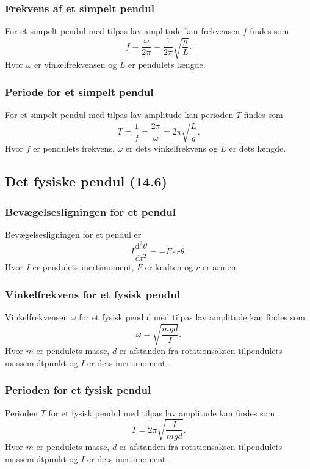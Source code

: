 \subsubsection{Frekvens af et simpelt pendul} \label{afs:frekspen}
For et simpelt pendul med tilpas lav amplitude kan frekvensen $f$ findes som
\[ 
f = \frac{\omega}{2\pi} = \frac{1}{2\pi} \sqrt{\frac{g}{L}}
.\]
Hvor $\omega$ er vinkelfrekvensen og $L$ er pendulets længde.


\subsubsection{Periode for et simpelt pendul} \label{afs:perspen}
For et simpelt pendul med tilpas lav amplitude kan perioden $T$ findes som
\[ 
T = \frac{1}{f} = \frac{2\pi}{\omega} = 2\pi \sqrt{\frac{L}{g}}
.\]
Hvor $f$ er pendulets frekvens, $\omega$ er dets vinkelfrekvens og $L$ er dets længde.



\subsection{Det fysiske pendul (14.6)}

\subsubsection{Bevægelsesligningen for et pendul} \label{afs:bevpen}
Bevægelsesligningen for et pendul er
\[ 
I \frac{\mathrm{d}^2 \theta}{\mathrm{d}t^2} = - F\cdot r \theta 
.\]
Hvor $I$ er pendulets inertimoment, $F$ er kraften og $r$ er armen.


\subsubsection{Vinkelfrekvens for et fysisk pendul} \label{afs:vinfrekfpen}
Vinkelfrekvensen $\omega$ for et fysisk pendul med tilpas lav amplitude kan findes som
\[ 
\omega = \sqrt{\frac{mgd}{I}}
.\]
Hvor $m$ er pendulets masse, $d$ er afstanden fra rotationsaksen tilpendulets massemidtpunkt og $I$ er dets inertimoment.


\subsubsection{Perioden for et fysisk pendul} \label{afs:perfpen}
Perioden $T$ for et fysisk pendul med tilpas lav amplitude kan findes som
\[ 
  T = 2\pi\sqrt{\frac{I}{mgd}}
.\]
Hvor $m$ er pendulets masse, $d$ er afstanden fra rotationsaksen tilpendulets massemidtpunkt og $I$ er dets inertimoment.

